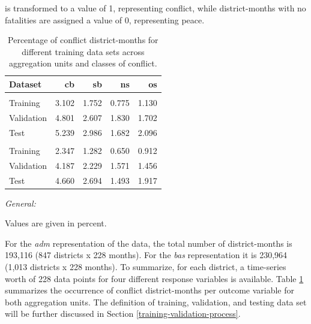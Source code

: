 \documentclass[a4paper,11pt]{article}
\begin{document}
is transformed to a value of 1, representing conflict, while district-months with
no fatalities are assigned a value of 0, representing peace.
\begin{table}[H]

\caption[Percentage of conflict district-months for different training data sets.]{\label{tab:02-data-response-dist}Percentage of conflict district-months for different training data sets across aggregation units and classes of conflict.}
\centering
\fontsize{10}{12}\selectfont
\begin{threeparttable}
\begin{tabular}[t]{lrrrr}
\toprule
Dataset & \textbf{cb} & \textbf{sb} & \textbf{ns} & \textbf{os}\\
\midrule
\addlinespace[0.3em]
\multicolumn{5}{l}{\textit{\textbf{adm}}}\\
\hspace{1em}Training & 3.102 & 1.752 & 0.775 & 1.130\\
\hspace{1em}Validation & 4.801 & 2.607 & 1.830 & 1.702\\
\hspace{1em}Test & 5.239 & 2.986 & 1.682 & 2.096\\
\addlinespace[0.3em]
\multicolumn{5}{l}{\textit{\textbf{bas}}}\\
\hspace{1em}Training & 2.347 & 1.282 & 0.650 & 0.912\\
\hspace{1em}Validation & 4.187 & 2.229 & 1.571 & 1.456\\
\hspace{1em}Test & 4.660 & 2.694 & 1.493 & 1.917\\
\bottomrule
\end{tabular}
\begin{tablenotes}[para]
\item \textit{General:} 
\item Values are given in percent.
\end{tablenotes}
\end{threeparttable}
\end{table}
For the \emph{adm} representation of the data, the total number of district-months is
193,116 (847 districts x 228 months). For the \emph{bas} representation it is 230,964
(1,013 districts x 228 months). To summarize, for each district, a time-series worth of
228 data points for four different response variables is available. Table
\ref{tab:02-data-response-dist} summarizes the occurrence of conflict district-months
per outcome variable for both aggregation units. The definition of training,
validation, and testing data set will be further discussed in Section
\ref{training-validation-process}.
\end{document}

